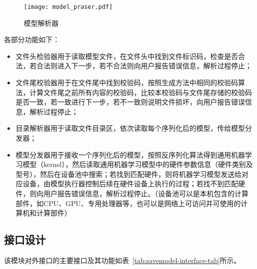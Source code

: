 \begin{figure}[htb]
  \centering
  \texttt{[image: model\_praser.pdf]}
  \caption{模型解析器}
  \label{fig:model_praser}
\end{figure}

各部分功能如下：

\begin{itemize}
  \item 文件头检验器用于读取模型文件，在文件头中找到文件标识码，检查是否合法，若合法则进入下一步，若不合法则向用户报告错误信息，解析过程停止；
  \item 文件尾校验器用于在文件尾中找到校验码，按照生成方法中相同的校验码算法，计算文件尾之前所有内容的校验码，比较本校验码与文件尾存储的校验码是否一致，若一致进行下一步，若不一致则说明文件损坏，向用户报告错误信息，解析过程停止；
  \item 目录解析器用于读取文件目录区，依次读取每个序列化后的模型，传给模型分发器；
  \item 模型分发器用于接收一个序列化后的模型，按照反序列化算法得到通用机器学习模型（kernel），然后读取通用机器学习模型中的硬件参数信息（硬件类别及型号），然后在设备池中搜索；若找到匹配硬件，则将机器学习模型发送给对应设备，由模型执行器控制后续在硬件设备上执行的过程；若找不到匹配硬件，则向用户报告错误信息，解析过程停止。（设备池可以是本机包含的计算部件，如CPU、GPU、专用处理器等，也可以是网络上可访问并可使用的计算机和计算部件）
\end{itemize}

\subsection {接口设计}

该模块对外接口的主要接口及其功能如表~\ref{tab:savemodel-interface-tab}所示。

\begin{table}[htb]
  \centering\small
  \caption{指令保存和加载模块对外接口}
  \label{tab:savemodel-interface-tab}
\end{table}

